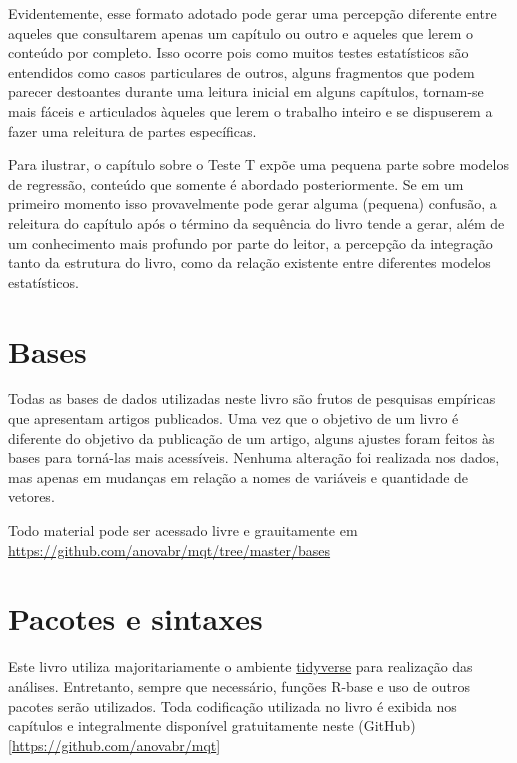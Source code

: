 \documentclass[
]{book}
\begin{document}
Evidentemente, esse formato adotado pode gerar uma percepção diferente entre aqueles que consultarem apenas um capítulo ou outro e aqueles que lerem o conteúdo por completo. Isso ocorre pois como muitos testes estatísticos são entendidos como casos particulares de outros, alguns fragmentos que podem parecer destoantes durante uma leitura inicial em alguns capítulos, tornam-se mais fáceis e articulados àqueles que lerem o trabalho inteiro e se dispuserem a fazer uma releitura de partes específicas.

Para ilustrar, o capítulo sobre o Teste T expõe uma pequena parte sobre modelos de regressão, conteúdo que somente é abordado posteriormente. Se em um primeiro momento isso provavelmente pode gerar alguma (pequena) confusão, a releitura do capítulo após o término da sequência do livro tende a gerar, além de um conhecimento mais profundo por parte do leitor, a percepção da integração tanto da estrutura do livro, como da relação existente entre diferentes modelos estatísticos.

\hypertarget{bases}{%
\section{Bases}\label{bases}}

Todas as bases de dados utilizadas neste livro são frutos de pesquisas empíricas que apresentam artigos publicados. Uma vez que o objetivo de um livro é diferente do objetivo da publicação de um artigo, alguns ajustes foram feitos às bases para torná-las mais acessíveis. Nenhuma alteração foi realizada nos dados, mas apenas em mudanças em relação a nomes de variáveis e quantidade de vetores.

Todo material pode ser acessado livre e grauitamente em \url{https://github.com/anovabr/mqt/tree/master/bases}

\hypertarget{pacotes-e-sintaxes}{%
\section{Pacotes e sintaxes}\label{pacotes-e-sintaxes}}

Este livro utiliza majoritariamente o ambiente \href{https://www.tidyverse.org/}{tidyverse} para realização das análises. Entretanto, sempre que necessário, funções R-base e uso de outros pacotes serão utilizados. Toda codificação utilizada no livro é exibida nos capítulos e integralmente disponível gratuitamente neste (GitHub){[}\url{https://github.com/anovabr/mqt}{]}
\end{document}
